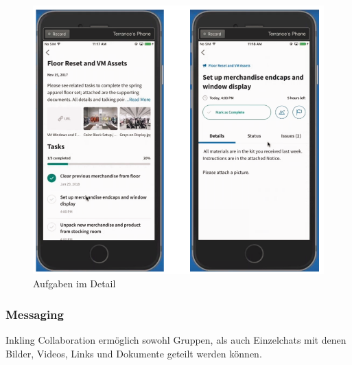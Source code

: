 \begin{figure}[H] 
\centering 
\includegraphics[scale=0.72]{images/inkdetails} 
\caption[Aufgaben im Detail]{Aufgaben im Detail\protect} 
\label{ws} 
\end{figure}

\subsubsection{Messaging}

Inkling Collaboration ermöglich sowohl Gruppen, als auch Einzelchats mit denen Bilder, Videos, Links und Dokumente geteilt werden können.

